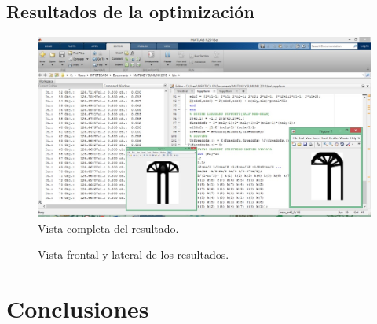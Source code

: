 \documentclass{article}
\begin{document}
\subsection{Resultados de la optimización}
\begin{figure}[htp] %
    \centering
    \includegraphics[width=150mm]{Vista completa.jpeg} %
    \caption{Vista completa del resultado.}
    \label{grafica}
\end{figure}
\begin{figure}[!tbp]
  \centering
  \hfill
  \caption{Vista frontal y lateral de los resultados.}
\end{figure}
 \newpage
\section{Conclusiones}
\end{document}
